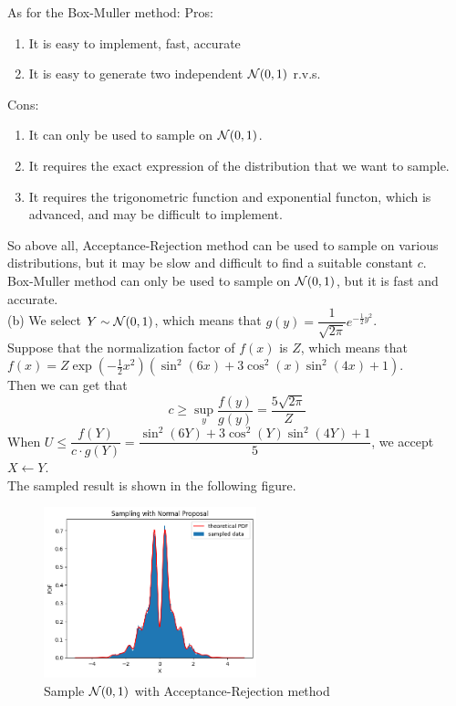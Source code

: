 \begin{homeworkProblem}
As for the Box-Muller method:
Pros:
\begin{enumerate}
    \item It is easy to implement, fast, accurate
    \item It is easy to generate two independent $\mathcal{N}(0,1)$ r.v.s.
\end{enumerate}
Cons:
\begin{enumerate}
    \item It can only be used to sample on $\mathcal{N}(0,1)$.
    \item It requires the exact expression of the distribution that we want to sample.
    \item It requires the trigonometric function and exponential functon, which is advanced, and may be difficult to implement.
\end{enumerate}
So above all, Acceptance-Rejection method can be used to sample on various distributions, but it may be slow and difficult to find a suitable constant $c$. \\
Box-Muller method can only be used to sample on $\mathcal{N}(0,1)$, but it is fast and accurate. \\

(b) We select $Y\sim\mathcal{N}(0,1)$, which means that $g(y)=\dfrac{1}{\sqrt{2\pi}}e^{-\frac{1}{2}y^2}$. \\
Suppose that the normalization factor of $f(x)$ is $Z$, which means that $f(x)=Z\exp\left(-\frac{1}{2}x^2\right)\left(\sin^2(6x)+3\cos^2(x)\sin^2(4x)+1\right)$. \\
Then we can get that
$$c\geq \sup_y\dfrac{f(y)}{g(y)}=\dfrac{5\sqrt{2\pi}}{Z}$$
When $U\leq \dfrac{f(Y)}{c\cdot g(Y)}=\dfrac{\sin^2(6Y)+3\cos^2(Y)\sin^2(4Y)+1}{5}$, we accept $X\gets Y$. \\
The sampled result is shown in the following figure. \\
\begin{figure}[h]
    \centering
    \includegraphics[width=0.55\textwidth]{./figure/p5/new_func.png}
    \caption{Sample $\mathcal{N}(0,1)$ with Acceptance-Rejection method}
\end{figure}

\end{homeworkProblem}

\newpage